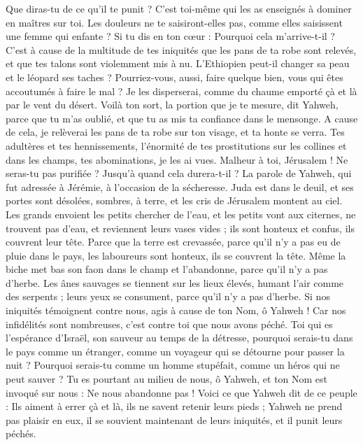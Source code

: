 \begin{multicols}{2}
Que diras-tu de ce qu’il te punit ? C’est toi-même qui les as enseignés à dominer en maîtres sur toi. Les douleurs ne te saisiront-elles pas, comme elles saisissent une femme qui enfante ?
Si tu dis en ton cœur : Pourquoi cela m’arrive-t-il ? C'est à cause de la multitude de tes iniquités que les pans de ta robe sont relevés, et que tes talons sont violemment mis à nu.
L’Ethiopien peut-il changer sa peau et le léopard ses taches ? Pourriez-vous, aussi, faire quelque bien, vous qui êtes accoutumés à faire le mal ?
Je les disperserai, comme du chaume emporté çà et là par le vent du désert.
Voilà ton sort, la portion que je te mesure, dit Yahweh, parce que tu m'as oublié, et que tu as mis ta confiance dans le mensonge.
A cause de cela, je relèverai les pans de ta robe sur ton visage, et ta honte se verra.
Tes adultères et tes hennissements, l'énormité de tes prostitutions sur les collines et dans les champs, tes abominations, je les ai vues. Malheur à toi, Jérusalem ! Ne seras-tu pas purifiée ? Jusqu’à quand cela durera-t-il ?
\VerseOne{}La parole de Yahweh, qui fut adressée à Jérémie, à l’occasion de la sécheresse.
Juda est dans le deuil, et ses portes sont désolées, sombres, à terre, et les cris de Jérusalem montent au ciel.
Les grands envoient les petits chercher de l’eau, et les petits vont aux citernes, ne trouvent pas d'eau, et reviennent leurs vases vides ; ils sont honteux et confus, ils couvrent leur tête.
Parce que la terre est crevassée, parce qu'il n'y a pas eu de pluie dans le pays, les laboureurs sont honteux, ils se couvrent la tête.
Même la biche met bas son faon dans le champ et l'abandonne, parce qu'il n'y a pas d'herbe.
Les ânes sauvages se tiennent sur les lieux élevés, humant l'air comme des serpents ; leurs yeux se consument, parce qu'il n'y a pas d'herbe.
Si nos iniquités témoignent contre nous, agis à cause de ton Nom, ô Yahweh ! Car nos infidélités sont nombreuses, c'est contre toi que nous avons péché.
Toi qui es l'espérance d'Israël, son sauveur au temps de la détresse, pourquoi serais-tu dans le pays comme un étranger, comme un voyageur qui se détourne pour passer la nuit ?
Pourquoi serais-tu comme un homme stupéfait, comme un héros qui ne peut sauver ? Tu es pourtant au milieu de nous, ô Yahweh, et ton Nom est invoqué sur nous : Ne nous abandonne pas !
Voici ce que Yahweh dit de ce peuple : Ils aiment à errer çà et là, ils ne savent retenir leurs pieds ; Yahweh ne prend pas plaisir en eux, il se souvient maintenant de leurs iniquités, et il punit leurs péchés.

\end{multicols}
